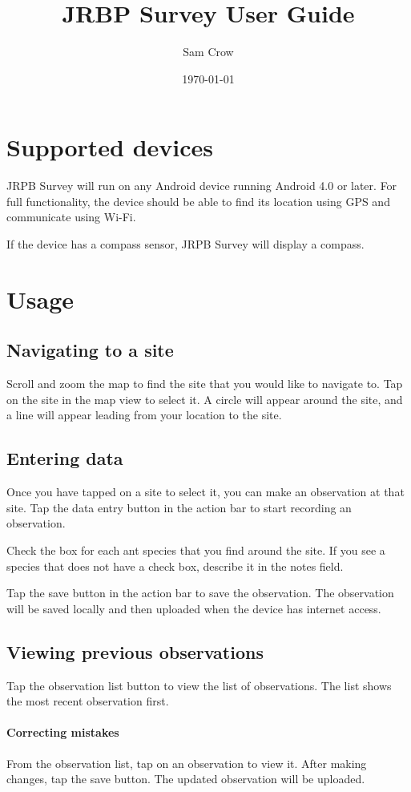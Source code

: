 \documentclass{article}
\title{JRBP Survey User Guide}
\author{Sam Crow}
\date{\today}
\begin{document}
\maketitle{}

\section{Supported devices}

JRPB Survey will run on any Android device running Android 4.0 or later. For full functionality, the device should be able to find its location using GPS and communicate using Wi-Fi.

If the device has a compass sensor, JRPB Survey will display a compass.

\section{Usage}

\subsection{Navigating to a site}

Scroll and zoom the map to find the site that you would like to navigate to. Tap on the site in the map view to select it. A circle will appear around the site, and a line will appear leading from your location to the site.

\subsection{Entering data}

Once you have tapped on a site to select it, you can make an observation at that site. Tap the data entry button in the action bar to start recording an observation.

Check the box for each ant species that you find around the site. If you see a species that does not have a check box, describe it in the notes field.

Tap the save button in the action bar to save the observation. The observation will be saved locally and then uploaded when the device has internet access.

\subsection{Viewing previous observations}

Tap the observation list button to view the list of observations. The list shows the most recent observation first.

\paragraph{Correcting mistakes}

From the observation list, tap on an observation to view it. After making changes, tap the save button. The updated observation will be uploaded.
\end{document}
